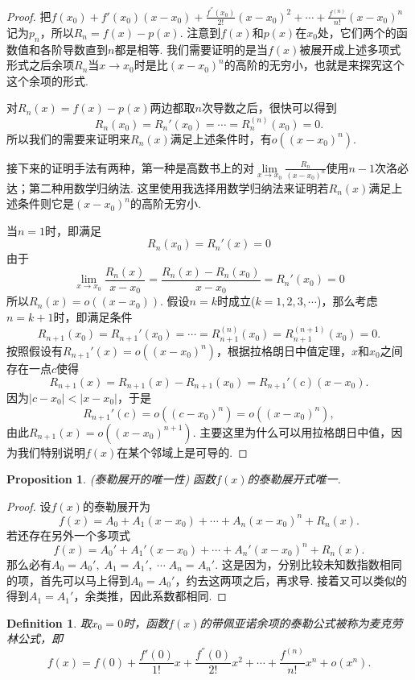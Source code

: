 \documentclass{article}
\newtheorem{proposition}[theorem]{Proposition}
\newtheorem{definition}[theorem]{Definition}
\begin{document}
\begin{proof}
把$f(x_0) + f'(x_0)(x-x_0) + \frac{f^{''}(x_0)}{2!}(x-x_0)^2 + \cdots + \frac{f^{(n)}}{n!}(x-x_0)^n$记为$p_n$，所以$R_n = f(x) - p(x)$. 注意到$f(x)$和$p(x)$在$x_0$处，它们两个的函数值和各阶导数直到$n$都是相等. 我们需要证明的是当$f(x)$被展开成上述多项式形式之后余项$R_n$当$x \rightarrow x_0$时是比$(x-x_0)^n$的高阶的无穷小，也就是来探究这个这个余项的形式. 

对$R_n(x) = f(x) - p(x)$两边都取$n$次导数之后，很快可以得到
$$
R_n(x_0) = R_n'(x_0) = \cdots = R_n^{(n)}(x_0) = 0.
$$
所以我们的需要来证明来$R_n(x)$满足上述条件时，有$o((x-x_0)^n)$.
 
接下来的证明手法有两种，{\color{red}第一种是高数书上的对$\lim\limits_{x \rightarrow x_0} \frac{R_n}{(x-x_0)^n}$使用$n-1$次洛必达}；{\color{blue}第二种用数学归纳法}. 这里使用我选择用数学归纳法来证明若$R_n(x)$满足上述条件则它是$(x-x_0)^n$的高阶无穷小.

当$n=1$时，即满足
$$
R_n(x_0) = R_n'(x) = 0
$$
由于
$$
\lim\limits_{x \rightarrow x_0} \frac{R_n(x)}{x-x_0}= \frac{R_n(x) - R_n(x_0)}{x-x_0} = R_n'(x_0) = 0
$$
所以$R_n(x) = o((x-x_0))$. 假设$n=k$时成立($k =1,2,3,\cdots$)，那么考虑$n=k+1$时，即满足条件
$$
R_{n+1}(x_0) = R_{n+1}'(x_0) = \cdots = R_{n+1}^{(n)}(x_0) = R_{n+1}^{(n+1)}(x_0)  = 0.
$$
按照假设有$R_{n+1}'(x) = o((x-x_0)^n)$，根据拉格朗日中值定理，$x$和$x_0$之间存在一点$c$使得
$$
R_{n+1}(x) = R_{n+1}(x) - R_{n+1}(x_0) =R_{n+1}'(c)(x-x_0). 
$$
因为$|c-x_0| < |x-x_0|$，于是
$$
R_{n+1}'(c) = o((c-x_0)^n) = o((x-x_0)^n),
$$
由此$R_{n+1}(x) = o((x-x_0)^{n+1})$. 主要这里为什么可以用拉格朗日中值，因为我们特别说明$f(x)$在某个邻域上是可导的.
\end{proof}

\begin{proposition}
\rm {\color{red} (泰勒展开的唯一性)} 函数$f(x)$的泰勒展开式唯一.
\end{proposition}

\begin{proof}
设$f(x)$的泰勒展开为
$$
f(x) = A_0 + A_1(x-x_0) + \cdots + A_n(x-x_0)^n + R_n(x).
$$
若还存在另外一个多项式
$$
f(x) = A_0' + A_1'(x-x_0) + \cdots + A_n'(x-x_0)^n + R_n(x).
$$
那么必有$A_0 = A_0',\; A_1 = A_1',\;\cdots \; A_n = A_n'$. 这是因为，分别比较未知数指数相同的项，首先可以马上得到$A_0 = A_0'$，约去这两项之后，再求导. 接着又可以类似的得到$A_1 = A_1'$，余类推，因此系数都相同.
\end{proof}

\begin{definition}
\rm 取$x_0 = 0$时，函数$f(x)$的带佩亚诺余项的泰勒公式被称为{\color{red}麦克劳林}公式，即
$$
f(x) = f(0)+\frac{f'(0)}{1!}x + \frac{f^{''}(0)}{2!}x^2 + \cdots + \frac{f^{(n)}}{n!}x^n + o(x^n).
$$
\end{definition}
\end{document}
